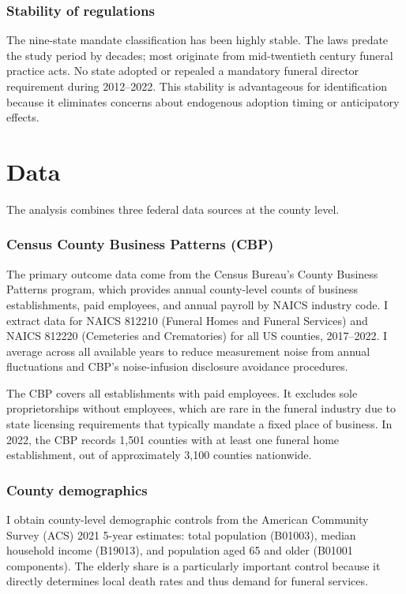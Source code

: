 \documentclass[12pt]{article}
\begin{document}
\subsubsection*{Stability of regulations} The nine-state mandate classification has been highly stable. The laws predate the study period by decades; most originate from mid-twentieth century funeral practice acts. No state adopted or repealed a mandatory funeral director requirement during 2012--2022. This stability is advantageous for identification because it eliminates concerns about endogenous adoption timing or anticipatory effects.


\section{Data}

The analysis combines three federal data sources at the county level.

\subsubsection*{Census County Business Patterns (CBP)} The primary outcome data come from the Census Bureau's County Business Patterns program, which provides annual county-level counts of business establishments, paid employees, and annual payroll by NAICS industry code. I extract data for NAICS 812210 (Funeral Homes and Funeral Services) and NAICS 812220 (Cemeteries and Crematories) for all US counties, 2017--2022. I average across all available years to reduce measurement noise from annual fluctuations and CBP's noise-infusion disclosure avoidance procedures.

The CBP covers all establishments with paid employees. It excludes sole proprietorships without employees, which are rare in the funeral industry due to state licensing requirements that typically mandate a fixed place of business. In 2022, the CBP records 1,501 counties with at least one funeral home establishment, out of approximately 3,100 counties nationwide.

\subsubsection*{County demographics} I obtain county-level demographic controls from the American Community Survey (ACS) 2021 5-year estimates: total population (B01003), median household income (B19013), and population aged 65 and older (B01001 components). The elderly share is a particularly important control because it directly determines local death rates and thus demand for funeral services.
\end{document}
